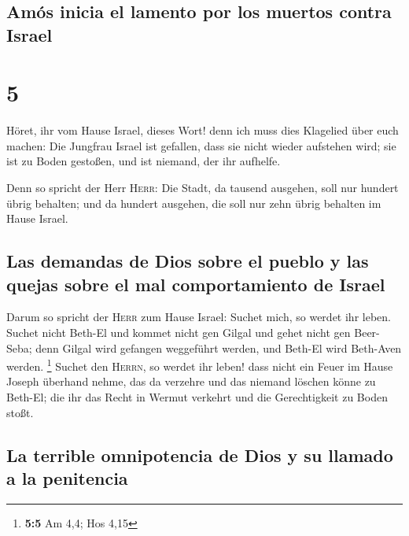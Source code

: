 \hypertarget{amuxf3s-inicia-el-lamento-por-los-muertos-contra-israel}{%
\subsection{Amós inicia el lamento por los muertos contra
Israel}\label{amuxf3s-inicia-el-lamento-por-los-muertos-contra-israel}}

\hypertarget{section-4}{%
\section{5}\label{section-4}}

 Höret, ihr vom Hause Israel, dieses Wort! denn ich muss
dies Klagelied über euch machen:  Die Jungfrau Israel ist
gefallen, dass sie nicht wieder aufstehen wird; sie ist zu Boden
gestoßen, und ist niemand, der ihr aufhelfe.

 Denn so spricht der Herr \textsc{Herr}: Die Stadt, da
tausend ausgehen, soll nur hundert übrig behalten; und da hundert
ausgehen, die soll nur zehn übrig behalten im Hause Israel.

\hypertarget{las-demandas-de-dios-sobre-el-pueblo-y-las-quejas-sobre-el-mal-comportamiento-de-israel}{%
\subsection{Las demandas de Dios sobre el pueblo y las quejas sobre el
mal comportamiento de
Israel}\label{las-demandas-de-dios-sobre-el-pueblo-y-las-quejas-sobre-el-mal-comportamiento-de-israel}}

 Darum so spricht der \textsc{Herr} zum Hause Israel:
Suchet mich, so werdet ihr leben.  Suchet nicht Beth-El
und kommet nicht gen Gilgal und gehet nicht gen Beer-Seba; denn Gilgal
wird gefangen weggeführt werden, und Beth-El wird Beth-Aven werden.
\footnote{\textbf{5:5} Am 4,4; Hos 4,15}  Suchet den
\textsc{Herrn}, so werdet ihr leben! dass nicht ein Feuer im Hause
Joseph überhand nehme, das da verzehre und das niemand löschen könne zu
Beth-El;  die ihr das Recht in Wermut verkehrt und die
Gerechtigkeit zu Boden stoßt.

\hypertarget{la-terrible-omnipotencia-de-dios-y-su-llamado-a-la-penitencia}{%
\subsection{La terrible omnipotencia de Dios y su llamado a la
penitencia}\label{la-terrible-omnipotencia-de-dios-y-su-llamado-a-la-penitencia}}

